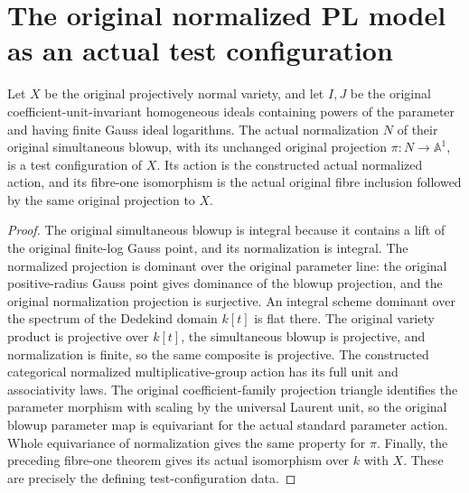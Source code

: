 \section{The original normalized PL model as an actual test configuration}

\begin{theorem}
\label{thm:pl-original-normalized-native-test-configuration}
\leanok
{}
Let $X$ be the original projectively normal variety, and let $I,J$ be the
original coefficient-unit-invariant homogeneous ideals containing powers
of the parameter and having finite Gauss ideal logarithms. The actual
normalization $N$ of their original simultaneous blowup, with its unchanged
original projection $\pi:N\to\mathbb A^1$, is a test configuration of $X$.
Its action is the constructed actual normalized action, and its fibre-one
isomorphism is the actual original fibre inclusion followed by the same
original projection to $X$.
\end{theorem}
\begin{proof}
The original simultaneous blowup is integral because it contains a lift of
the original finite-log Gauss point, and its normalization is integral.
The normalized projection is dominant over the original parameter line:
the original positive-radius Gauss point gives dominance of the blowup
projection, and the original normalization projection is surjective.
An integral scheme dominant over the spectrum of the Dedekind domain $k[t]$
is flat there. The original variety product is projective over $k[t]$,
the simultaneous blowup is projective, and normalization is finite, so the
same composite is projective. The constructed categorical normalized
multiplicative-group action has its full unit and associativity laws.
The original coefficient-family projection triangle identifies the
parameter morphism with scaling by the universal Laurent unit, so the
original blowup parameter map is equivariant for the actual standard
parameter action. Whole equivariance of normalization gives the same
property for $\pi$. Finally, the preceding fibre-one theorem gives its
actual isomorphism over $k$ with $X$. These are precisely the defining
test-configuration data.
\end{proof}


